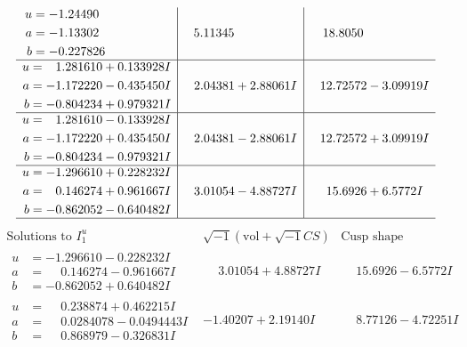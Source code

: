 \documentclass[1p]{elsarticle_modified}
\theoremstyle{definition}
\newcommand{\I}{\sqrt{-1}}
\begin{document}
$$\begin{array}{c|c|c}
\begin{aligned}
u &= -1.24490\phantom{ +0.000000I} \\
a &= -1.13302\phantom{ +0.000000I} \\
b &= -0.227826\phantom{ +0.000000I}\end{aligned}
 & \phantom{-}5.11345\phantom{ +0.000000I} & \phantom{-}18.8050\phantom{ +0.000000I} \\ \hline\begin{aligned}
u &= \phantom{-}1.281610 + 0.133928 I \\
a &= -1.172220 - 0.435450 I \\
b &= -0.804234 + 0.979321 I\end{aligned}
 & \phantom{-}2.04381 + 2.88061 I & \phantom{-}12.72572 - 3.09919 I \\ \hline\begin{aligned}
u &= \phantom{-}1.281610 - 0.133928 I \\
a &= -1.172220 + 0.435450 I \\
b &= -0.804234 - 0.979321 I\end{aligned}
 & \phantom{-}2.04381 - 2.88061 I & \phantom{-}12.72572 + 3.09919 I \\ \hline\begin{aligned}
u &= -1.296610 + 0.228232 I \\
a &= \phantom{-}0.146274 + 0.961667 I \\
b &= -0.862052 - 0.640482 I\end{aligned}
 & \phantom{-}3.01054 - 4.88727 I & \phantom{-}15.6926 + 6.5772 I\\
 \hline 
 \end{array}$$\newpage$$\begin{array}{c|c|c}  
\text{Solutions to }I^u_{1}& \I (\text{vol} + \sqrt{-1}CS) & \text{Cusp shape}\\
 \hline 
\begin{aligned}
u &= -1.296610 - 0.228232 I \\
a &= \phantom{-}0.146274 - 0.961667 I \\
b &= -0.862052 + 0.640482 I\end{aligned}
 & \phantom{-}3.01054 + 4.88727 I & \phantom{-}15.6926 - 6.5772 I \\ \hline\begin{aligned}
u &= \phantom{-}0.238874 + 0.462215 I \\
a &= \phantom{-}0.0284078 - 0.0494443 I \\
b &= \phantom{-}0.868979 - 0.326831 I\end{aligned}
 & -1.40207 + 2.19140 I & \phantom{-}8.77126 - 4.72251 I \\ \hline\begin{aligned}

\end{aligned}
\end{array}$$
\end{document}
